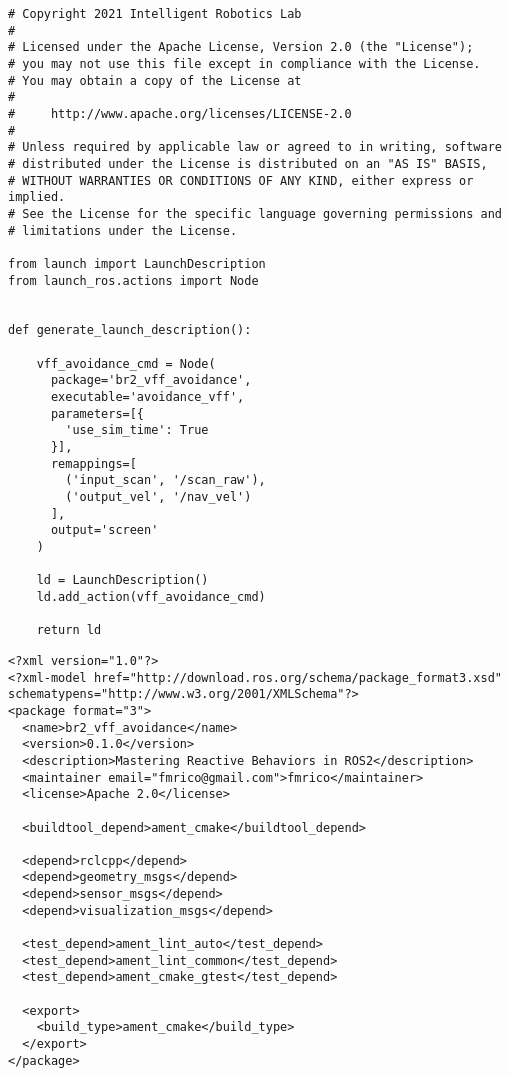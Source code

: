  \footnotesize
\begin{tcolorbox}[sharp corners, colframe=gray!80, colback=LightGray, left=0pt, top=0pt, bottom=0pt, title=\texttt{br2\_vff\_avoidance/launch/avoidance\_vff.launch.py}]
  \begin{verbatim}
# Copyright 2021 Intelligent Robotics Lab
#
# Licensed under the Apache License, Version 2.0 (the "License");
# you may not use this file except in compliance with the License.
# You may obtain a copy of the License at
#
#     http://www.apache.org/licenses/LICENSE-2.0
#
# Unless required by applicable law or agreed to in writing, software
# distributed under the License is distributed on an "AS IS" BASIS,
# WITHOUT WARRANTIES OR CONDITIONS OF ANY KIND, either express or implied.
# See the License for the specific language governing permissions and
# limitations under the License.

from launch import LaunchDescription
from launch_ros.actions import Node


def generate_launch_description():

    vff_avoidance_cmd = Node(
      package='br2_vff_avoidance',
      executable='avoidance_vff',
      parameters=[{
        'use_sim_time': True
      }],
      remappings=[
        ('input_scan', '/scan_raw'),
        ('output_vel', '/nav_vel')
      ],
      output='screen'
    )

    ld = LaunchDescription()
    ld.add_action(vff_avoidance_cmd)

    return ld
    \end{verbatim}
    \end{tcolorbox}
  \normalsize

 \footnotesize
\begin{tcolorbox}[sharp corners, colframe=gray!80, colback=LightGray, left=0pt, top=0pt, bottom=0pt, title=\texttt{br2\_vff\_avoidance/package.xml}]
  \begin{verbatim}
<?xml version="1.0"?>
<?xml-model href="http://download.ros.org/schema/package_format3.xsd" schematypens="http://www.w3.org/2001/XMLSchema"?>
<package format="3">
  <name>br2_vff_avoidance</name>
  <version>0.1.0</version>
  <description>Mastering Reactive Behaviors in ROS2</description>
  <maintainer email="fmrico@gmail.com">fmrico</maintainer>
  <license>Apache 2.0</license>

  <buildtool_depend>ament_cmake</buildtool_depend>

  <depend>rclcpp</depend>
  <depend>geometry_msgs</depend>
  <depend>sensor_msgs</depend>
  <depend>visualization_msgs</depend>

  <test_depend>ament_lint_auto</test_depend>
  <test_depend>ament_lint_common</test_depend>
  <test_depend>ament_cmake_gtest</test_depend>

  <export>
    <build_type>ament_cmake</build_type>
  </export>
</package>
    \end{verbatim}
    \end{tcolorbox}
  \normalsize

